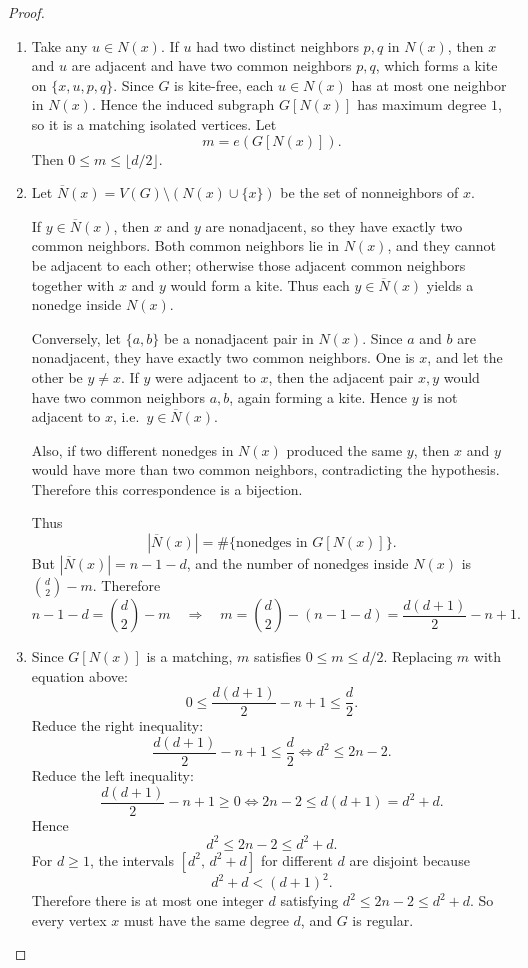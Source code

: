 \documentclass[11pt]{article}
\begin{document}
\begin{proof}
    \begin{enumerate}
        \item 
Take any $u\in N(x)$. If $u$ had two distinct neighbors $p,q$ in $N(x)$, then $x$ and $u$ are adjacent
and have two common neighbors $p,q$, which forms a kite on $\{x,u,p,q\}$. Since $G$ is kite-free,
each $u\in N(x)$ has at most one neighbor in $N(x)$. Hence the induced subgraph $G[N(x)]$ has maximum degree $1$,
so it is a matching isolated vertices. Let
\[
m = e(G[N(x)]).
\]
Then $0\le m \le \lfloor d/2\rfloor$.

\item 
Let $\overline{N}(x)=V(G)\setminus (N(x)\cup\{x\})$ be the set of nonneighbors of $x$.

If $y\in \overline{N}(x)$, then $x$ and $y$ are nonadjacent, so they have exactly two common neighbors.
Both common neighbors lie in $N(x)$, and they cannot be adjacent to each other; otherwise those adjacent common neighbors
together with $x$ and $y$ would form a kite. Thus each $y\in\overline{N}(x)$ yields a nonedge inside $N(x)$.

Conversely, let $\{a,b\}$ be a nonadjacent pair in $N(x)$. Since $a$ and $b$ are nonadjacent, they have exactly
two common neighbors. One is $x$, and let the other be $y\neq x$.
If $y$ were adjacent to $x$, then the adjacent pair $x,y$ would have two common neighbors $a,b$, again forming a kite.
Hence $y$ is not adjacent to $x$, i.e.\ $y\in \overline{N}(x)$.

Also, if two different nonedges in $N(x)$ produced the same $y$, then $x$ and $y$ would have more than two common neighbors,
contradicting the hypothesis. Therefore this correspondence is a bijection.

Thus
\[
|\overline{N}(x)| = \#\{\text{nonedges in }G[N(x)]\}.
\]
But $|\overline{N}(x)|=n-1-d$, and the number of nonedges inside $N(x)$ is $\binom{d}{2}-m$.
Therefore
\[
n-1-d = \binom{d}{2}-m
\quad\Longrightarrow\quad
m = \binom{d}{2}-(n-1-d) = \frac{d(d+1)}{2} - n + 1.
\]

\item 
Since $G[N(x)]$ is a matching, $m$ satisfies $0\le m \le d/2$. Replacing $m$ with equation above:
\[
0 \le \frac{d(d+1)}{2} - n + 1 \le \frac{d}{2}.
\]
Reduce the right inequality:
\[
\frac{d(d+1)}{2} - n + 1 \le \frac{d}{2}
\iff d^2 \le 2n-2.
\]
Reduce the left inequality:
\[
\frac{d(d+1)}{2} - n + 1 \ge 0
\iff 2n-2 \le d(d+1)=d^2+d.
\]
Hence
\[
d^2 \le 2n-2 \le d^2+d.
\]
For $d\ge 1$, the intervals $[d^2,\,d^2+d]$ for different $d$ are disjoint because
\[
d^2+d < (d+1)^2.
\]
Therefore there is at most one integer $d$ satisfying $d^2 \le 2n-2 \le d^2+d$.
So every vertex $x$ must have the same degree $d$, and $G$ is regular.
    \end{enumerate}
\end{proof}
\end{document}
